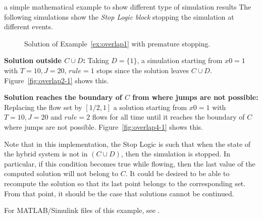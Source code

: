 \begin{example}{a simple mathematical example to show different type of simulation results}
The following simulations show the {\em Stop Logic block} stopping
the simulation at different events.
\begin{figure}[ht]
  \centering
\qquad
{}
\caption{Solution of Example~\ref{ex:overlap1} with premature stopping.}
\end{figure}

{\bf Solution outside $C\cup D$:}
Taking $D = \{1\}$, a simulation starting from $x0=1$ with $T=10,J=20$, $rule = 1$ stops since the solution leaves $C\cup D$. Figure~\ref{fig:overlap2-1} shows this.

{\bf Solution reaches the boundary of $C$ from where jumps are not possible:}
Replacing the flow set by  $[1/2,1]$
a solution starting from $x0=1$ with $T=10,J=20$ and $rule = 2$
flows for all time until it reaches the boundary of
$C$ where jumps are not possible. Figure~\ref{fig:overlap4-1}
shows this.

Note that in this implementation, the Stop Logic is such that when the
state of the hybrid system is not in $(C \cup D)$, then the
simulation is stopped. In particular, if this condition becomes true
while flowing, then the last value of the computed solution will not
belong to $C$. It
could be desired to be able to recompute the solution so that its last
point belongs to the corresponding set. From that point, it should be
the case that solutions cannot be continued.

For MATLAB/Simulink files of this example, see .

\end{example}



